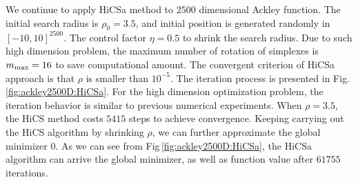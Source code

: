 \documentclass[final,1p,times]{elsarticle}
\begin{document}
\newpage

We continue to apply HiCSa method to $2500$ dimensional
Ackley function. The initial search radius is $\rho_0=3.5$, and
initial position is generated randomly in $[-10,10]^{2500}$. 
The control factor $\eta=0.5$ to shrink the search radius. 
Due to such high dimension problem, the maximum number of
rotation of simplexes is $m_{\rm max}=16$ to save computational amount.
The convergent criterion of HiCSa approach is that $\rho$ is smaller than $10^{-5}$.
The iteration process is presented in Fig.\,\ref{fig:ackley2500D:HiCSa}. 
For the high dimension optimization problem, the iteration
behavior is similar to previous numerical experiments. 
When $\rho=3.5$, the HiCS method costs $5415$ steps to achieve
convergence. Keeping carrying out the HiCS algorithm
by shrinking $\rho$, we can further approximate the global
minimizer $0$. 
As we can see from Fig\,\ref{fig:ackley2500D:HiCSa}, 
the HiCSa algorithm can arrive the global minimizer, as well as
function value after $61755$ iterations.
\end{document}
